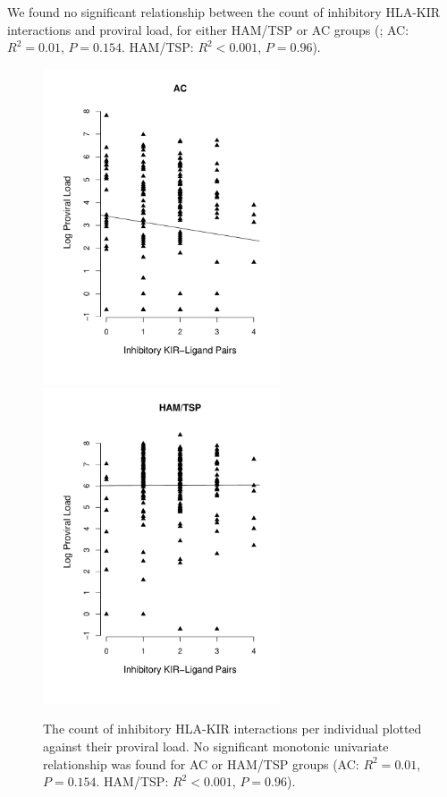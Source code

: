 We found no significant relationship between the count of inhibitory HLA-KIR interactions and proviral load, for either HAM/TSP or AC groups (; AC: $R^2 = 0.01$, $P = 0.154$. HAM/TSP: $R^2 < 0.001$, $P = 0.96$).

\begin{figure}[htp]
\centering
\includegraphics[width=7cm]{./Figures/chapter7/figureInhibAC}%
\hspace{0cm}%
\includegraphics[width=7cm]{./Figures/chapter7/figureInhibHAM} \\
\caption[Inhibitory HLA-KIR interactions and proviral load]{The count of inhibitory HLA-KIR interactions per individual plotted against their proviral load. No significant monotonic univariate relationship was found for AC or HAM/TSP groups (AC: $R^2 = 0.01$, $P = 0.154$. HAM/TSP: $R^2 < 0.001$, $P = 0.96$).}
\label{chapter7/figure1}
\end{figure}

